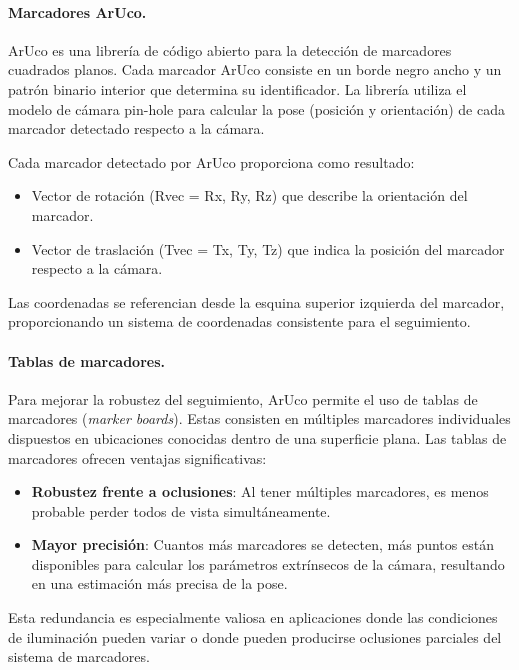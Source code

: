 \paragraph{Marcadores ArUco.}
ArUco es una librería de código abierto para la detección de marcadores cuadrados planos. Cada marcador ArUco consiste en un borde negro ancho y un patrón binario interior que determina su identificador. La librería utiliza el modelo de cámara pin-hole para calcular la \gls{pose} (posición y orientación) de cada marcador detectado respecto a la cámara.

Cada marcador detectado por ArUco proporciona como resultado:
\begin{itemize}
	\item Vector de rotación (Rvec = {Rx, Ry, Rz}) que describe la orientación del marcador.
	\item Vector de traslación (Tvec = {Tx, Ty, Tz}) que indica la posición del marcador respecto a la cámara.
\end{itemize}

Las coordenadas se referencian desde la esquina superior izquierda del marcador, proporcionando un sistema de coordenadas consistente para el seguimiento.

\paragraph{Tablas de marcadores.}
Para mejorar la robustez del seguimiento, ArUco permite el uso de tablas de marcadores (\emph{marker boards}). Estas consisten en múltiples marcadores individuales dispuestos en ubicaciones conocidas dentro de una superficie plana. Las tablas de marcadores ofrecen ventajas significativas:

\begin{itemize}
	\item \textbf{Robustez frente a oclusiones}: Al tener múltiples marcadores, es menos probable perder todos de vista simultáneamente.
	\item \textbf{Mayor precisión}: Cuantos más marcadores se detecten, más puntos están disponibles para calcular los parámetros extrínsecos de la cámara, resultando en una estimación más precisa de la pose.
\end{itemize}

Esta redundancia es especialmente valiosa en aplicaciones donde las condiciones de iluminación pueden variar o donde pueden producirse oclusiones parciales del sistema de marcadores.

